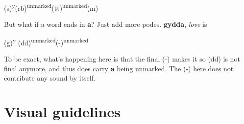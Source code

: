 \documentclass[10pt,oneside]{memoir}
\begin{document}
\begin{center}
    \Large (s)\textsuperscript{y}(rb)\textsuperscript{unmarked}(tt)\textsuperscript{unmarked}(m)
\end{center}

But what if a word ends in \textbf{a}? Just add more podes. \textbf{gydda}, \emph{love} is

\begin{center}
    \Large (g)\textsuperscript{y} (dd)\textsuperscript{unmarked}(-)\textsuperscript{unmarked}
\end{center}

To be exact, what's happening here is that the final (-) makes it so (dd) is not final anymore, and thus does carry \textbf{a} being unmarked. The (-) here does not contribute any sound by itself.

\section{Visual guidelines}

\vfill
\end{document}
